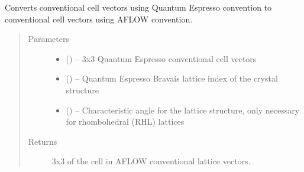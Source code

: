 \documentclass[letterpaper,10pt,english]{sphinxmanual}
\begin{document}
\begin{fulllineitems}
\label{\detokenize{retr:retr.conv_qe2aflow}}
Converts conventional cell vectors using Quantum Espresso convention to
conventional cell vectors using AFLOW convention.
\begin{quote}\begin{description}
\item[{Parameters}] \leavevmode\begin{itemize}
\item {} 
 () -- 3x3 Quantum Espresso conventional cell vectors

\item {} 
 () -- Quantum Espresso Bravais lattice index of the crystal
structure

\item {} 
 () -- Characteristic angle for the lattice structure, only
necessary for rhombohedral (RHL) lattices

\end{itemize}

\item[{Returns}] \leavevmode
3x3  of the cell in AFLOW conventional lattice vectors.

\end{description}\end{quote}

\end{fulllineitems}

\end{document}
